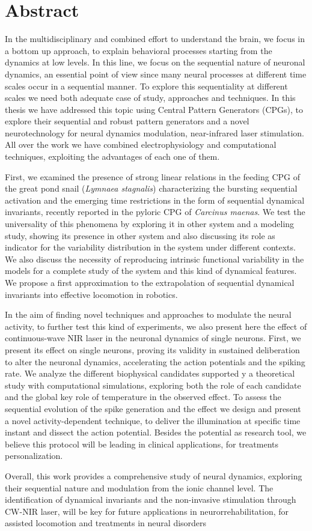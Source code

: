 \chapter*{Abstract}
In the multidisciplinary and combined effort to understand the brain, we focus in a bottom up approach, to explain behavioral processes starting from the dynamics at low levels. In this line, we focus on the sequential nature of neuronal dynamics, an essential point of view since many neural processes at different time scales occur in a sequential manner. To explore this sequentiality at different scales we need both adequate case of study, approaches and techniques. In this thesis we have addressed this topic using Central Pattern Generators (CPGs), to explore their sequential and robust pattern generators and a novel neurotechnology for neural dynamics modulation, near-infrared laser stimulation. All over the work we have combined electrophysiology and computational techniques, exploiting the advantages of each one of them. 

First, we examined the presence of strong linear relations in the feeding CPG of the great pond snail (\textit{Lymnaea stagnalis}) characterizing the bursting sequential activation and the emerging time restrictions in the form of sequential dynamical invariants, recently reported in the pyloric CPG of \textit{Carcinus maenas}. We test the universality of this phenomena by exploring it in other system and a modeling study, showing its presence in other system and also discussing its role as indicator for the variability distribution in the system under different contexts. We also discuss the necessity of reproducing intrinsic functional variability in the models for a complete study of the system and this kind of dynamical features. We propose a first approximation to the extrapolation of sequential dynamical invariants into effective locomotion in robotics. 

In the aim of finding novel techniques and approaches to modulate the neural activity, to further test this kind of experiments, we also present here the effect of continuous-wave NIR laser in the neuronal dynamics of single neurons. First, we present its effect on single neurons, proving its validity in sustained deliberation to alter the neuronal dynamics, accelerating the action potentials and the spiking rate. We analyze the different biophysical candidates supported y a theoretical study with computational simulations, exploring both the role of each candidate and the global key role of temperature in the observed effect. To assess the sequential evolution of the spike generation and the effect we design and present a novel activity-dependent technique, to deliver the illumination at specific time instant and dissect the action potential. Besides the potential as research tool, we believe this protocol will be leading in clinical applications, for treatments personalization. 

Overall, this work provides a comprehensive study of neural dynamics, exploring their sequential nature and modulation from the ionic channel level. The identification of dynamical invariants and the non-invasive stimulation through CW-NIR laser, will be key for future applications in neurorrehabilitation, for assisted locomotion and treatments in neural disorders